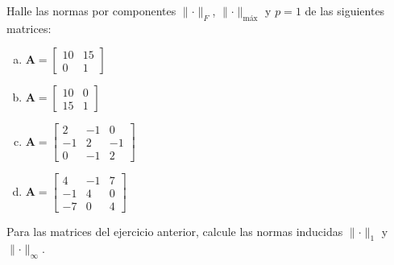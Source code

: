 \documentclass[11pt]{article}
\begin{document}
\begin{question} %
    Halle las normas por componentes $\lVert \cdot \rVert_F$, $\lVert \cdot \rVert_{\text{máx}}$ y  $p = 1$ de las siguientes matrices:
    \begin{enumerate}[a)]
        \item $\bm{A} = \begin{bmatrix} 10 & 15 \\ 0 & 1 \end{bmatrix}$
        \item $\bm{A} = \begin{bmatrix}
            10 & 0 \\ 15 & 1 \end{bmatrix}$
        \item $\bm{A} = \begin{bmatrix}
            2 & -1 & 0 \\ -1 & 2 & -1 \\
            0 & -1 & 2\end{bmatrix}$
        \item $\bm{A} = \begin{bmatrix}
            4 & -1 & 7 \\ -1 & 4 & 0 \\
            -7 & 0 & 4\end{bmatrix}$
    \end{enumerate}
\end{question}

\begin{question} %
    Para las matrices del ejercicio anterior, calcule las normas inducidas $\lVert \cdot \rVert_{1}$ y  $\lVert \cdot \rVert_{\infty}$.
\end{question}
\end{document}
